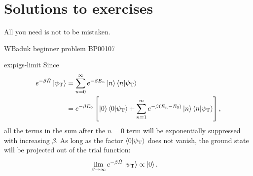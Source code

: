 \chapter{Solutions to exercises}

\label{chap:solutions}

\epigraph{
All you need is not to be mistaken.
}{
WBaduk beginner problem BP00107
}

\begin{DefAnswer}{ex:pigs-limit}
	Since
	\begin{subequations}
	\begin{align}
		e^{-\beta \hat{H}} \ket{\psi_\mathrm{T}}
		&= \sum_{n=0}^\infty e^{-\beta E_n} \ket{n} \braket{n | \psi_\mathrm{T}} \\
		&= e^{-\beta E_0} \left[ \ket{0} \braket{0 | \psi_\mathrm{T}} + \sum_{n=1}^\infty e^{-\beta (E_n - E_0)} \ket{n} \braket{n | \psi_\mathrm{T}} \right],
	\end{align}
	\end{subequations}
	all the terms in the sum after the $n = 0$ term will be exponentially suppressed with increasing $\beta$.
	As long as the factor $\braket{0 | \psi_\mathrm{T}}$ does not vanish, the ground state will be projected out of the trial function:
	\begin{align}
		\lim_{\beta \to \infty} e^{-\beta \hat{H}} \ket{\psi_\mathrm{T}}
		&\propto \ket{0}.
	\end{align}
\end{DefAnswer}

